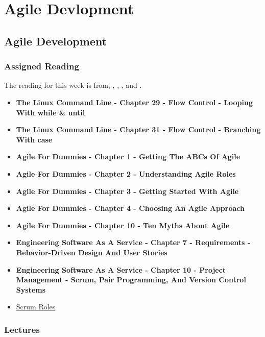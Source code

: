 \clearpage

\renewcommand{\ChapTitle}{Agile Devlopment}
\renewcommand{\SectionTitle}{Agile Development}

\chapter{\ChapTitle}

\section{\SectionTitle}

\subsection{Assigned Reading}

The reading for this week is from, \AgileBook, \EngSoftBook, \ProGitBook, and \LinuxBook.

\begin{itemize}
    \item \textbf{The Linux Command Line - Chapter 29 - Flow Control - Looping With while \& until}
    \item \textbf{The Linux Command Line - Chapter 31 - Flow Control - Branching With case}
    \item \textbf{Agile For Dummies - Chapter 1 - Getting The ABCs Of Agile}
    \item \textbf{Agile For Dummies - Chapter 2 - Understanding Agile Roles}
    \item \textbf{Agile For Dummies - Chapter 3 - Getting Started With Agile}
    \item \textbf{Agile For Dummies - Chapter 4 - Choosing An Agile Approach}
    \item \textbf{Agile For Dummies - Chapter 10 - Ten Myths About Agile}
    \item \textbf{Engineering Software As A Service - Chapter 7 - Requirements - Behavior-Driven Design And User Stories}
    \item \textbf{Engineering Software As A Service - Chapter 10 - Project Management - Scrum, Pair Programming, And Version Control Systems}
    \item \href{https://www.atlassian.com/agile/scrum/roles}{Scrum Roles}
\end{itemize}

\subsection{Lectures}

